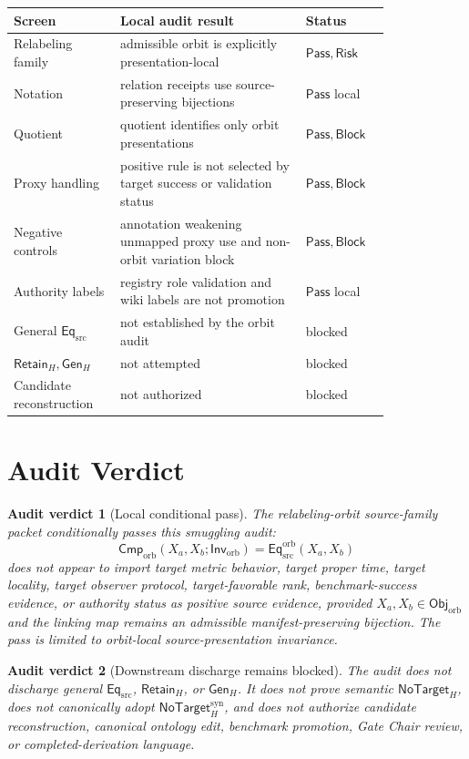\documentclass[11pt]{article}
\newcommand{\ObjOrb}{\mathsf{Obj}_{\mathrm{orb}}}
\newcommand{\InvOrb}{\mathsf{Inv}_{\mathrm{orb}}}
\newcommand{\CmpOrb}{\mathsf{Cmp}_{\mathrm{orb}}}
\newcommand{\EqSrc}{\mathsf{Eq}_{\mathrm{src}}}
\newcommand{\EqOrb}{\mathsf{Eq}_{\mathrm{src}}^{\mathrm{orb}}}
\newcommand{\GenH}{\mathsf{Gen}_{H}}
\newcommand{\RetainH}{\mathsf{Retain}_{H}}
\newcommand{\NoTargetH}{\mathsf{NoTarget}_{H}}
\newcommand{\NoTargetSyn}{\mathsf{NoTarget}_{H}^{\mathrm{syn}}}
\newcommand{\Pass}{\mathsf{Pass}}
\newcommand{\Block}{\mathsf{Block}}
\newcommand{\Risk}{\mathsf{Risk}}
\newtheorem{auditverdict}{Audit verdict}
\begin{document}
\begin{center}
\begin{tabular}{p{0.22\linewidth}p{0.42\linewidth}p{0.18\linewidth}}
\textbf{Screen} & \textbf{Local audit result} & \textbf{Status} \\
\hline
Relabeling family & admissible orbit is explicitly presentation-local & \(\Pass,\Risk\) \\
Notation & relation receipts use source-preserving bijections & \(\Pass\) local \\
Quotient & quotient identifies only orbit presentations & \(\Pass,\Block\) \\
Proxy handling & positive rule is not selected by target success or validation status & \(\Pass,\Block\) \\
Negative controls & annotation weakening unmapped proxy use and non-orbit variation block & \(\Pass,\Block\) \\
Authority labels & registry role validation and wiki labels are not promotion & \(\Pass\) local \\
General \(\EqSrc\) & not established by the orbit audit & blocked \\
\(\RetainH,\GenH\) & not attempted & blocked \\
Candidate reconstruction & not authorized & blocked \\
\end{tabular}
\end{center}

\section{Audit Verdict}

\begin{auditverdict}[Local conditional pass]
The relabeling-orbit source-family packet conditionally passes this
smuggling audit:
\[
    \CmpOrb(X_{a},X_{b};\InvOrb)=\EqOrb(X_{a},X_{b})
\]
does not appear to import target metric behavior, target proper time,
target locality, target observer protocol, target-favorable rank,
benchmark-success evidence, or authority status as positive source
evidence, provided \(X_{a},X_{b}\in\ObjOrb\) and the linking map remains
an admissible manifest-preserving bijection. The pass is limited to
orbit-local source-presentation invariance.
\end{auditverdict}

\begin{auditverdict}[Downstream discharge remains blocked]
The audit does not discharge general \(\EqSrc\), \(\RetainH\), or
\(\GenH\). It does not prove semantic \(\NoTargetH\), does not
canonically adopt \(\NoTargetSyn\), and does not authorize candidate
reconstruction, canonical ontology edit, benchmark promotion, Gate Chair
review, or completed-derivation language.
\end{auditverdict}
\end{document}
